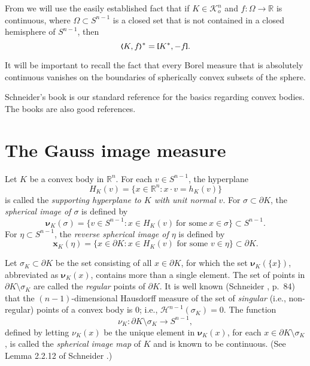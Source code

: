 \documentclass{cpamart1}     %
\theoremstyle{definition}
\theoremstyle{remark}
\newcommand{\rbo}{\mathbb R}
\newcommand{\rn}{\mathbb R^n}
\newcommand{\sn}{S^{n-1}}
\newcommand{\kno}{\mathcal K^n_o}
\newcommand{\bx}{\pmb{x}}
\newcommand{\bu}{\pmb{\nu}}
\newcommand{\hm}{\mathcal H^{n-1}}
\newcommand{\blb}{\raise.3ex\hbox{$\scriptstyle \pmb \lbrack$}}
\newcommand{\brb}{\raise.3ex\hbox{$\scriptstyle \pmb \rbrack$}}
\newcommand{\bla}{\raise.2ex\hbox{$\scriptstyle\pmb \langle$}}
\newcommand{\bra}{\raise.2ex\hbox{$\scriptstyle\pmb \rangle$}}
\begin{document}
From \cite{HLYZ16} we will use the easily established fact that if $K\in\kno$ and
$f: \Omega \to \rbo$ is continuous, where $\Omega \subset \sn$ is a closed set that
is not contained in a closed hemisphere of $\sn$, then
\begin{equation}\label{polarHLYZ}
\bla K,f\bra^* = \blb K^*,-f\brb.
\end{equation}


It will be important to recall the fact that every Borel  measure that is absolutely continuous vanishes on the boundaries of spherically convex subsets of the sphere.

\smallskip





Schneider's book \cite{S14} is our standard reference for the basics regarding
convex bodies. The books \cite{G06book, Gruberbook} are also good references.







\section{The Gauss image measure} \label{gim}

Let $K$ be a convex body in $\rn$. For each $v\in \sn$, the hyperplane
\begin{equation*}
H_K(v) = \{x \in \rn : x\cdot v = h_K(v)\}
\end{equation*}
is called the {\it supporting hyperplane to $K$ with unit normal $v$}.
For $\sigma\subset\partial K$, the {\it spherical image of $\sigma$} is defined by
\begin{equation*}
\bu_K(\sigma) = \{v\in\sn : x\in H_K(v)\ \text{for some}\ x\in\sigma \} \subset\sn.
\end{equation*}
For $\eta\subset\sn$, the {\it reverse spherical image of $\eta$} is defined by
\[
\bx_K(\eta)=\{ x\in \partial K : x\in H_K(v) \text{ for some } v\in \eta\}
\subset \partial K.
\]

Let $\sigma_K\subset \partial K$ be the set consisting of all $x\in \partial K$,
for which the set
$\bu_K(\{x\})$, abbreviated as $\bu_K(x)$, contains more than a single element.
The set of points in
$\partial K \setminus \sigma_K$ are called the {\it regular} points of $\partial K$.
It is well known (Schneider \cite{S14},  p.\ 84) that the $(n-1)$-dimensional Hausdorff measure of the set of {\it singular}
(i.e., non-regular) points of a convex body is $0$; i.e.,  $\hm (\sigma_K) = 0$.
The function
\begin{equation*}
\nu_K: \partial K \setminus \sigma_K \to \sn,
\end{equation*}
defined by letting $\nu_K(x)$ be the unique element in $\bu_K(x)$, for each
$x \in \partial K \setminus \sigma_K $, is called the {\it spherical image map} of $K$
and is known to be continuous. (See Lemma 2.2.12 of Schneider \cite{S14}.)
\end{document}
